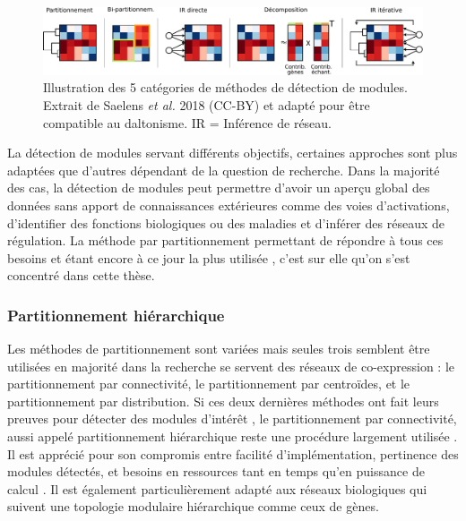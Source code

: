 \begin{figure}[h!]
    \centering
    \includegraphics[width=\textwidth]{img/intro/3_coexpr/intro_3_coexpr_category_detection_module.pdf}
    \caption[Illustration des 5 catégories de méthodes de détection de modules.]{Illustration des 5 catégories de méthodes de détection de modules. Extrait de Saelens \textit{et al.} 2018 (CC-BY) \cite{Saelens2018} et adapté pour être compatible au daltonisme. IR = Inférence de réseau.}
    \label{fig:category_detection_module}
\end{figure}

La détection de modules servant différents objectifs, certaines approches sont plus adaptées que d'autres dépendant de la question de recherche. Dans la majorité des cas, la détection de modules peut permettre d'avoir un aperçu global des données sans apport de connaissances extérieures comme des voies d'activations, d'identifier des fonctions biologiques ou des maladies et d'inférer des réseaux de régulation. La méthode par partitionnement permettant de répondre à tous ces besoins \cite{Filteau2013,Sundarrajan2016,Kogelman2014} et étant encore à ce jour la plus utilisée \cite{Saelens2018}, c'est sur elle qu'on s'est concentré dans cette thèse.

\subsubsection{Partitionnement hiérarchique}

Les méthodes de partitionnement sont variées mais seules trois semblent être utilisées en majorité dans la recherche se servent des réseaux de co-expression : le partitionnement par connectivité, le partitionnement par centroïdes, et le partitionnement par distribution. Si ces deux dernières méthodes ont fait leurs preuves pour détecter des modules d'intérêt \cite{Ruan2006Dec,Shi2010Dec, Rau2018}, le partitionnement par connectivité, aussi appelé partitionnement hiérarchique reste une procédure largement utilisée \cite{Tang2018, Mao2009, Rotival2013}. Il est apprécié pour son compromis entre facilité d'implémentation, pertinence des modules détectés, et besoins en ressources tant en temps qu'en puissance de calcul \cite{Saelens2018}. Il est également particulièrement adapté aux réseaux biologiques qui suivent une topologie modulaire hiérarchique comme ceux de gènes. 

